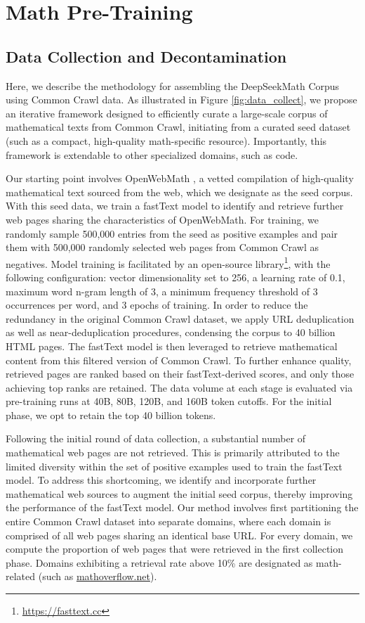\section{Math Pre-Training}

\subsection{Data Collection and Decontamination} 

Here, we describe the methodology for assembling the DeepSeekMath Corpus using Common Crawl data. As illustrated in Figure \ref{fig:data_collect}, we propose an iterative framework designed to efficiently curate a large-scale corpus of mathematical texts from Common Crawl, initiating from a curated seed dataset (such as a compact, high-quality math-specific resource). Importantly, this framework is extendable to other specialized domains, such as code.

Our starting point involves OpenWebMath \citep{openwebmath}, a vetted compilation of high-quality mathematical text sourced from the web, which we designate as the seed corpus. With this seed data, we train a fastText model \citep{joulin2016fasttext} to identify and retrieve further web pages sharing the characteristics of OpenWebMath. For training, we randomly sample 500,000 entries from the seed as positive examples and pair them with 500,000 randomly selected web pages from Common Crawl as negatives. Model training is facilitated by an open-source library\footnote{\url{https://fasttext.cc}}, with the following configuration: vector dimensionality set to 256, a learning rate of 0.1, maximum word n-gram length of 3, a minimum frequency threshold of 3 occurrences per word, and 3 epochs of training. In order to reduce the redundancy in the original Common Crawl dataset, we apply URL deduplication as well as near-deduplication procedures, condensing the corpus to 40 billion HTML pages. The fastText model is then leveraged to retrieve mathematical content from this filtered version of Common Crawl. To further enhance quality, retrieved pages are ranked based on their fastText-derived scores, and only those achieving top ranks are retained. The data volume at each stage is evaluated via pre-training runs at 40B, 80B, 120B, and 160B token cutoffs. For the initial phase, we opt to retain the top 40 billion tokens.

Following the initial round of data collection, a substantial number of mathematical web pages are not retrieved. This is primarily attributed to the limited diversity within the set of positive examples used to train the fastText model. To address this shortcoming, we identify and incorporate further mathematical web sources to augment the initial seed corpus, thereby improving the performance of the fastText model. Our method involves first partitioning the entire Common Crawl dataset into separate domains, where each domain is comprised of all web pages sharing an identical base URL. For every domain, we compute the proportion of web pages that were retrieved in the first collection phase. Domains exhibiting a retrieval rate above 10\% are designated as math-related (such as \url{mathoverflow.net}). 

